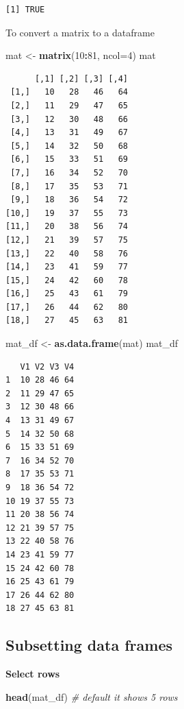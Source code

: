 \documentclass[]{book}
\newenvironment{Shaded}{\begin{snugshade}}{\end{snugshade}}
\newcommand{\CommentTok}[1]{\textcolor[rgb]{0.56,0.35,0.01}{\textit{#1}}}
\newcommand{\DataTypeTok}[1]{\textcolor[rgb]{0.13,0.29,0.53}{#1}}
\newcommand{\DecValTok}[1]{\textcolor[rgb]{0.00,0.00,0.81}{#1}}
\newcommand{\KeywordTok}[1]{\textcolor[rgb]{0.13,0.29,0.53}{\textbf{#1}}}
\newcommand{\NormalTok}[1]{#1}
\newcommand{\OperatorTok}[1]{\textcolor[rgb]{0.81,0.36,0.00}{\textbf{#1}}}
\newcommand{\StringTok}[1]{\textcolor[rgb]{0.31,0.60,0.02}{#1}}
\begin{document}
\begin{verbatim}
[1] TRUE
\end{verbatim}

To convert a matrix to a dataframe

\begin{Shaded}
\begin{Highlighting}[]
\NormalTok{mat <-}\StringTok{ }\KeywordTok{matrix}\NormalTok{(}\DecValTok{10}\OperatorTok{:}\DecValTok{81}\NormalTok{, }\DataTypeTok{ncol=}\DecValTok{4}\NormalTok{)}
\NormalTok{mat}
\end{Highlighting}
\end{Shaded}

\begin{verbatim}
      [,1] [,2] [,3] [,4]
 [1,]   10   28   46   64
 [2,]   11   29   47   65
 [3,]   12   30   48   66
 [4,]   13   31   49   67
 [5,]   14   32   50   68
 [6,]   15   33   51   69
 [7,]   16   34   52   70
 [8,]   17   35   53   71
 [9,]   18   36   54   72
[10,]   19   37   55   73
[11,]   20   38   56   74
[12,]   21   39   57   75
[13,]   22   40   58   76
[14,]   23   41   59   77
[15,]   24   42   60   78
[16,]   25   43   61   79
[17,]   26   44   62   80
[18,]   27   45   63   81
\end{verbatim}

\begin{Shaded}
\begin{Highlighting}[]
\NormalTok{mat_df <-}\StringTok{ }\KeywordTok{as.data.frame}\NormalTok{(mat)}
\NormalTok{mat_df}
\end{Highlighting}
\end{Shaded}

\begin{verbatim}
   V1 V2 V3 V4
1  10 28 46 64
2  11 29 47 65
3  12 30 48 66
4  13 31 49 67
5  14 32 50 68
6  15 33 51 69
7  16 34 52 70
8  17 35 53 71
9  18 36 54 72
10 19 37 55 73
11 20 38 56 74
12 21 39 57 75
13 22 40 58 76
14 23 41 59 77
15 24 42 60 78
16 25 43 61 79
17 26 44 62 80
18 27 45 63 81
\end{verbatim}

\hypertarget{subsetting-data-frames}{%
\subsection{Subsetting data frames}\label{subsetting-data-frames}}

\textbf{Select rows}

\begin{Shaded}
\begin{Highlighting}[]
\KeywordTok{head}\NormalTok{(mat_df) }\CommentTok{# default it shows 5 rows}
\end{Highlighting}
\end{Shaded}
\end{document}
